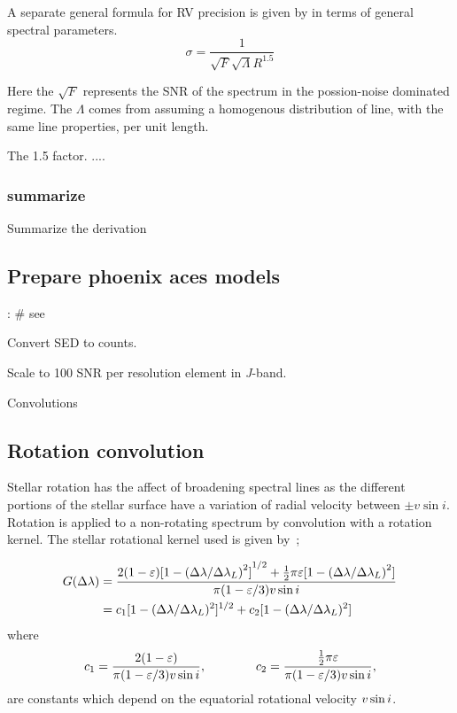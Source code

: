 A separate general formula for RV precision is given by \citet{hatzes_spectrograph_1992} in terms of general spectral parameters.
\begin{equation}
\sigma = \frac{1}{\sqrt{F} \sqrt{\Lambda} R^{1.5}}
\end{equation}

Here the $\sqrt{F}$ represents the SNR of the spectrum in the possion-noise dominated regime. The $\Lambda$ comes from assuming a homogenous distribution of line, with the same line properties, per unit length. 


The 1.5 factor. ....

\subsubsection{summarize}
Summarize the derivation

\subsection{Prepare phoenix aces models}:
\# see~\citet{figueira_radial_2016}

Convert SED to counts.


Scale to 100 {SNR} per resolution element in \emph{J}-band.

Convolutions

\subsection{Rotation convolution}
Stellar rotation has the affect of broadening spectral lines as the different portions of the stellar surface have a variation of radial velocity between \(\pm v \sin i\). 
Rotation is applied to a non-rotating spectrum by convolution with a rotation kernel.
The stellar rotational kernel used is given by~\citet{gray_observation_2005};


\begin{align}
G(\Delta\lambda) &= \frac{2(1-\varepsilon){[1-{(\Delta\lambda /{\Delta\lambda}_{L})}^{2}]}^{1/2} +   \frac{1}{2}\pi\varepsilon[1-{(\Delta\lambda /{\Delta\lambda}_{L})}^{2}]}{\pi (1-\varepsilon/3)v\sin{i}}\\
      &= c_{1}[1- (\Delta\lambda /\Delta\lambda_{L})^2]^{1/2} + c_{2}[1-(\Delta\lambda /\Delta\lambda_{L})^2] \label{eqn:rotational_profile}
\end{align}
where
\begin{equation}
c_1 = \frac{2(1-\varepsilon)} {\pi (1-\varepsilon/3)v\sin{i}},  \hspace{4em} c_2 = \frac{\frac{1}{2}\pi\varepsilon} {\pi (1-\varepsilon/3)v\sin{i}},
\end{equation}
are constants which depend on the equatorial rotational velocity \(v\sin{i}\).

